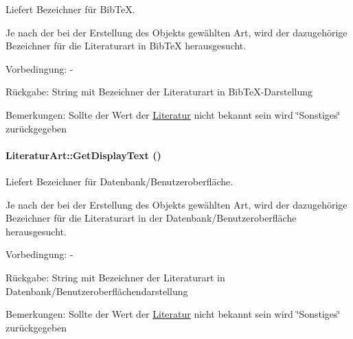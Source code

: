 Liefert Bezeichner für Bib\-Te\-X. 

Je nach der bei der Erstellung des Objekts gewählten Art, wird der dazugehörige Bezeichner für die Literaturart in Bib\-Te\-X herausgesucht. \begin{Desc}
\item[Vorbedingung:]- \end{Desc}
\begin{Desc}
\item[R\"{u}ckgabe:]String mit Bezeichner der Literaturart in Bib\-Te\-X-Darstellung \end{Desc}
\begin{Desc}
\item[Bemerkungen:]Sollte der Wert der \hyperlink{classLiteratur}{Literatur} nicht bekannt sein wird \char`\"{}Sonstiges\char`\"{} zurückgegeben \end{Desc}
\hypertarget{classLiteraturArt_43f747a6c5d840a22ddcd7e46d27cba0}{
\paragraph[GetDisplayText]{\setlength{\rightskip}{0pt plus 5cm}Literatur\-Art::Get\-Display\-Text ()}\hfill}
\label{classLiteraturArt_43f747a6c5d840a22ddcd7e46d27cba0}


Liefert Bezeichner für Datenbank/Benutzeroberfläche. 

Je nach der bei der Erstellung des Objekts gewählten Art, wird der dazugehörige Bezeichner für die Literaturart in der Datenbank/Benutzeroberfläche herausgesucht. \begin{Desc}
\item[Vorbedingung:]- \end{Desc}
\begin{Desc}
\item[R\"{u}ckgabe:]String mit Bezeichner der Literaturart in Datenbank/Benutzeroberflächendarstellung \end{Desc}
\begin{Desc}
\item[Bemerkungen:]Sollte der Wert der \hyperlink{classLiteratur}{Literatur} nicht bekannt sein wird \char`\"{}Sonstiges\char`\"{} zurückgegeben \end{Desc}

